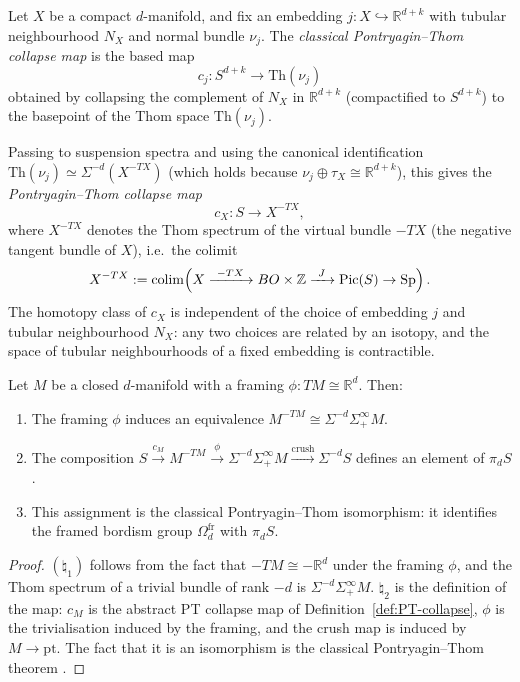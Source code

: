 \documentclass{amsart}
\begin{document}
\begin{definition}
\label{def:PT-collapse}
Let $X$ be a compact $d$-manifold, and fix an embedding $j \colon X \hookrightarrow \mathbb{R}^{d+k}$ with tubular neighbourhood $N_X$ and normal bundle $\nu_j$. The \emph{classical Pontryagin--Thom collapse map} is the based map
\[
c_j \colon S^{d+k} \longrightarrow \mathrm{Th}(\nu_j)
\]
obtained by collapsing the complement of $N_X$ in $\mathbb{R}^{d+k}$ (compactified to $S^{d+k}$) to the basepoint of the Thom space $\mathrm{Th}(\nu_j)$.

Passing to suspension spectra and using the canonical identification $\mathrm{Th}(\nu_j) \simeq \Sigma^{-d}(X^{-TX})$ (which holds because $\nu_j \oplus \tau_X \cong \mathbb{R}^{d+k}$), this gives the \emph{Pontryagin--Thom collapse map}
\[
c_X \colon S \longrightarrow X^{-TX},
\]
where $X^{-TX}$ denotes the Thom spectrum of the virtual bundle $-TX$ (the negative tangent bundle of $X$), i.e.\ the colimit
\[
X^{-TX} := \operatorname{colim}\!\left(X \xrightarrow{\ -TX\ } BO \times \mathbb{Z} \xrightarrow{\ J\ } \mathrm{Pic}(S) \to \mathrm{Sp}\right).
\]
The homotopy class of $c_X$ is independent of the choice of embedding $j$ and tubular neighbourhood $N_X$: any two choices are related by an isotopy, and the space of tubular neighbourhoods of a fixed embedding is contractible.
\end{definition}


\begin{proposition}
\label{prop:framed-PT}
Let $M$ be a closed $d$-manifold with a framing $\phi \colon TM \cong \mathbb{R}^d$. Then:
\begin{enumerate}
\item[$\natural_1$] The framing $\phi$ induces an equivalence $M^{-TM} \cong \Sigma^{-d}\Sigma^\infty_+ M$.
\item[$\natural_2$] 
The composition $S \xrightarrow{c_M} M^{-TM} \xrightarrow{\phi} \Sigma^{-d}\Sigma^\infty_+ M \xrightarrow{\text{crush}} \Sigma^{-d} S$ defines an element of $\pi_d S$. 
\item[$\natural_3$] This assignment is the classical Pontryagin--Thom isomorphism: it identifies the framed bordism group $\Omega_d^{\mathrm{fr}}$ with $\pi_d S$.
\end{enumerate}
\end{proposition}

\begin{proof}
$(\natural_1)$ follows from the fact that $-TM \cong -\mathbb{R}^d$ under the framing $\phi$, and the Thom spectrum of a trivial bundle of rank $-d$ is $\Sigma^{-d} \Sigma^\infty_+ M$. $\natural_2$ is the definition of the map: $c_M$ is the abstract PT collapse map of Definition~\ref{def:PT-collapse}, $\phi$ is the trivialisation induced by the framing, and the crush map is induced by $M \to \mathrm{pt}$. The fact that it is an isomorphism is the classical Pontryagin--Thom theorem \cite[Chapter IX]{Kosinski93}.
\end{proof}
\end{document}
